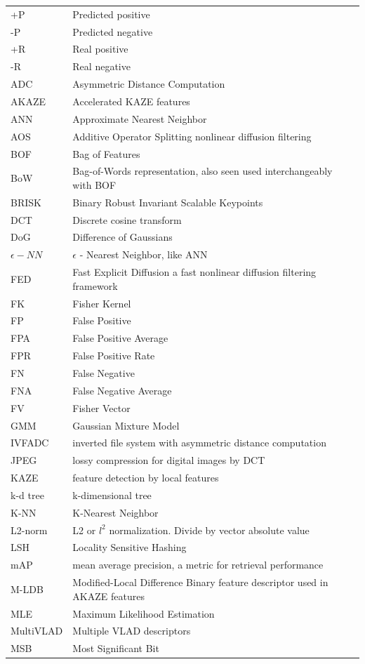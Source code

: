 \documentclass[english,12pt,a4paper,pdftex,elec,utf8, table]{aaltothesis}
\begin{document}
\begin{tabular}{ll}
  +P & Predicted positive\\
  -P & Predicted negative\\
  +R & Real positive\\
  -R & Real negative\\
  ADC & Asymmetric Distance Computation\\
  AKAZE & Accelerated KAZE features\\
  ANN & Approximate Nearest Neighbor\\
  AOS & Additive Operator Splitting nonlinear diffusion filtering\\
  BOF & Bag of Features\\
  BoW & Bag-of-Words representation, also seen used interchangeably with BOF\\
  BRISK & Binary Robust Invariant Scalable Keypoints\\
  DCT & Discrete cosine transform\\
  DoG & Difference of Gaussians\\
  $\epsilon -NN$ & $\epsilon$ - Nearest Neighbor, like ANN\\
  FED & Fast Explicit Diffusion a fast nonlinear diffusion filtering framework\\
  FK & Fisher Kernel\\
  FP & False Positive\\
  FPA & False Positive Average\\
  FPR & False Positive Rate\\
  FN & False Negative\\
  FNA & False Negative Average\\
  FV & Fisher Vector\\
  GMM & Gaussian Mixture Model\\
  IVFADC & inverted file system with asymmetric distance computation\\
  JPEG & lossy compression for digital images by DCT\\
  KAZE & feature detection by local features\\
  k-d tree & k-dimensional tree\\
  K-NN & K-Nearest Neighbor\\
  L2-norm & L2 or $l^2$ normalization. Divide by vector absolute value\\
  LSH & Locality Sensitive Hashing\\
  mAP & mean average precision, a metric for retrieval performance\\
  M-LDB & Modified-Local Difference Binary feature descriptor used in AKAZE features\\
  MLE & Maximum Likelihood Estimation\\
  MultiVLAD & Multiple VLAD descriptors\\
  MSB & Most Significant Bit\\
\end{tabular}
\end{document}
